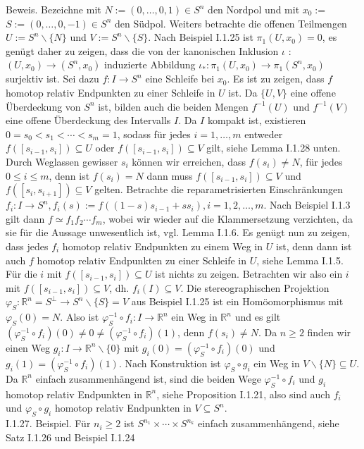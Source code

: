 \documentclass[10pt]{article}
\begin{document}
Beweis. Bezeichne mit $N:=(0, \ldots, 0,1) \in S^{n}$ den Nordpol und mit $x_{0}:=$ $S:=(0, \ldots, 0,-1) \in S^{n}$ den Südpol. Weiters betrachte die offenen Teilmengen $U:=S^{n} \backslash\{N\}$ und $V:=S^{n} \backslash\{S\}$. Nach Beispiel I.1.25 ist $\pi_{1}\left(U, x_{0}\right)=0$, es genügt daher zu zeigen, dass die von der kanonischen Inklusion $\iota$ : $\left(U, x_{0}\right) \rightarrow\left(S^{n}, x_{0}\right)$ induzierte Abbildung $\iota_{*}: \pi_{1}\left(U, x_{0}\right) \rightarrow \pi_{1}\left(S^{n}, x_{0}\right)$ surjektiv ist. Sei dazu $f: I \rightarrow S^{n}$ eine Schleife bei $x_{0}$. Es ist zu zeigen, dass $f$ homotop relativ Endpunkten zu einer Schleife in $U$ ist. Da $\{U, V\}$ eine offene Überdeckung von $S^{n}$ ist, bilden auch die beiden Mengen $f^{-1}(U)$ und $f^{-1}(V)$ eine offene Überdeckung des Intervalls $I$. Da $I$ kompakt ist, existieren $0=s_{0}<s_{1}<\cdots<s_{m}=1$, sodass für jedes $i=1, \ldots, m$ entweder $f\left(\left[s_{i-1}, s_{i}\right]\right) \subseteq U$ oder $f\left(\left[s_{i-1}, s_{i}\right]\right) \subseteq V$ gilt, siehe Lemma I.1.28 unten. Durch Weglassen gewisser $s_{i}$ können wir erreichen, dass $f\left(s_{i}\right) \neq N$, für jedes $0 \leq i \leq m$, denn ist $f\left(s_{i}\right)=N$ dann muss $f\left(\left[s_{i-1}, s_{i}\right]\right) \subseteq V$ und $f\left(\left[s_{i}, s_{i+1}\right]\right) \subseteq V$ gelten. Betrachte die reparametrisierten Einschränkungen $f_{i}: I \rightarrow S^{n}, f_{i}(s):=f\left((1-s) s_{i-1}+s s_{i}\right), i=1,2, \ldots, m$. Nach Beispiel I.1.3 gilt dann $f \simeq f_{1} f_{2} \cdots f_{m}$, wobei wir wieder auf die Klammersetzung verzichten, da sie für die Aussage unwesentlich ist, vgl. Lemma I.1.6. Es genügt nun zu zeigen, dass jedes $f_{i}$ homotop relativ Endpunkten zu einem Weg in $U$ ist, denn dann ist auch $f$ homotop relativ Endpunkten zu einer Schleife in $U$, siehe Lemma I.1.5. Für die $i$ mit $f\left(\left[s_{i-1}, s_{i}\right]\right) \subseteq U$ ist nichts zu zeigen. Betrachten wir also ein $i$ mit $f\left(\left[s_{i-1}, s_{i}\right]\right) \subseteq V$, dh. $f_{i}(I) \subseteq V$. Die stereographischen Projektion $\varphi_{S}: \mathbb{R}^{n}=S^{\perp} \rightarrow S^{n} \backslash\{S\}=V$ aus Beispiel I.1.25 ist ein Homöomorphismus mit $\varphi_{S}(0)=N$. Also ist $\varphi_{S}^{-1} \circ f_{i}: I \rightarrow \mathbb{R}^{n}$ ein Weg in $\mathbb{R}^{n}$ und es gilt $\left(\varphi_{S}^{-1} \circ f_{i}\right)(0) \neq 0 \neq\left(\varphi_{S}^{-1} \circ f_{i}\right)(1)$, denn $f\left(s_{i}\right) \neq N$. Da $n \geq 2$ finden wir einen Weg $g_{i}: I \rightarrow \mathbb{R}^{n} \backslash\{0\}$ mit $g_{i}(0)=\left(\varphi_{S}^{-1} \circ f_{i}\right)(0)$ und $g_{i}(1)=\left(\varphi_{S}^{-1} \circ f_{i}\right)(1)$. Nach Konstruktion ist $\varphi_{S} \circ g_{i}$ ein Weg in $V \backslash\{N\} \subseteq U$. Da $\mathbb{R}^{n}$ einfach zusammenhängend ist, sind die beiden Wege $\varphi_{S}^{-1} \circ f_{i}$ und $g_{i}$ homotop relativ Endpunkten in $\mathbb{R}^{n}$, siehe Proposition I.1.21, also sind auch $f_{i}$ und $\varphi_{S} \circ g_{i}$ homotop relativ Endpunkten in $V \subseteq S^{n}$.\\
I.1.27. Beispiel. Für $n_{i} \geq 2$ ist $S^{n_{1}} \times \cdots \times S^{n_{k}}$ einfach zusammenhängend, siehe Satz I.1.26 und Beispiel I.1.24
\end{document}
